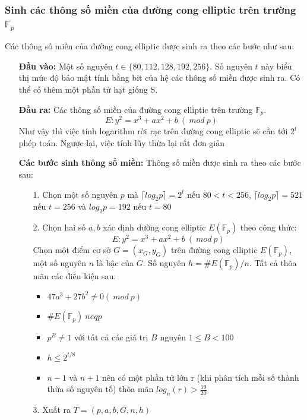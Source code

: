 \documentclass[a4paper,12pt]{report}
\begin{document}
\subsubsection{Sinh các thông số miền của đường cong elliptic trên trường $\mathbb{F}_p$}
Các thông số miền của đường cong elliptic được sinh ra theo các bước như sau:
\begin{itemize}
\item[] \textbf{Đầu vào:} Một số nguyên $t \in \{80, 112, 128, 192, 256\}$. Số nguyên $t$ này biểu thị mức độ bảo mật tính bằng bit của hệ các thông số miền được sinh ra. Có thể có thêm một phần tử hạt giống S.
\item[] \textbf{Đầu ra:} Các thông số miền của đường cong elliptic trên trường $\mathbb{F}_p$.
\begin{displaymath}
E: y^2 = x^3 + ax^2 + b \ (\ mod \ p)
\end{displaymath}
Như vậy thì việc tính logarithm rời rạc trên đường cong elliptic sẽ cần tới $2^t$ phép toán. Ngược lại, việc tính lũy thừa lại rất đơn giản
\item[] \textbf{Các bước sinh thông số miền:} Thông số miền được sinh ra theo các bước sau:
\begin{itemize}
\item[1. ] Chọn một số nguyên $p$ mà $\lceil log_2p \rceil = 2^t$ nếu $80 < t < 256$, $\lceil log_2p \rceil = 521$ nếu $t = 256$ và $log_2p = 192$ nếu $t = 80$
\item[2. ] Chọn hai số $a, b$ xác định đường cong elliptic $E(\mathbb{F}_p)$ theo công thức:
\begin{displaymath}
E: y^2 = x^3 + ax^2 + b \ (\ mod \ p)
\end{displaymath}
Chọn một điểm cơ sở $G = (x_G, y_G)$ trên đường cong elliptic $E(\mathbb{F}_p)$, một số nguyên $n$ là bậc của $G$. Số nguyên $h = \#E(\mathbb{F}_p)/n$. Tất cả thõa mãn các điều kiện sau:
\begin{itemize}
\item $47a^3 + 27b^2 \neq 0 (\ mod \ p)$
\item $\#E(\mathbb{F}_p) \ neq p$ 
\item $p^B \neq 1$ với tất cả các giá trị $B$ nguyên $1 \leq B < 100$
\item $h \leq 2^{t/8}$
\item $n - 1$ và $n + 1$ nên có một phần tử lớn r (khi phân tích mỗi số thành thừa số nguyên tố) thõa mãn $\displaystyle log_n(r) > \frac{19}{20}$
\end{itemize}
\item[3. ] Xuất ra $T = (p, a, b, G, n, h)$
\end{itemize}
\end{itemize}
\end{document}
